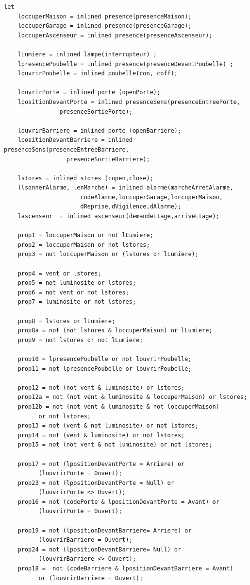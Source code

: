 \documentclass{svjour3}
\begin{document}
\begin{lstlisting}
let
	loccuperMaison = inlined presence(presenceMaison);
	loccuperGarage = inlined presence(presenceGarage);
	loccuperAscenseur = inlined presence(presenceAscenseur);

	lLumiere = inlined lampe(interrupteur) ;
	lpresencePoubelle = inlined presence(presenceDevantPoubelle) ;
	louvrirPoubelle = inlined poubelle(con, coff);

	louvrirPorte = inlined porte (openPorte);
	lpositionDevantPorte = inlined presenceSens(presenceEntreePorte,
				presenceSortiePorte);

	louvrirBarriere = inlined porte (openBarriere);
	lpositionDevantBarriere = inlined presenceSens(presenceEntreeBarriere,
				  presenceSortieBarriere);

	lstores = inlined stores (copen,close);
	(lsonnerAlarme, lenMarche) = inlined alarme(marcheArretAlarme,
				      codeAlarme,loccuperGarage,loccuperMaison,
				      dReprise,dVigilence,dAlarme);
	lascenseur  = inlined ascenseur(demandeEtage,arriveEtage);
	
	prop1 = loccuperMaison or not lLumiere;
	prop2 = loccuperMaison or not lstores;
	prop3 = not loccuperMaison or (lstores or lLumiere);
	
	prop4 = vent or lstores;
	prop5 = not luminosite or lstores;
	prop6 = not vent or not lstores;	
	prop7 = luminosite or not lstores;
	
	prop8 = lstores or lLumiere;
	prop8a = not (not lstores & loccuperMaison) or lLumiere;
	prop9 = not lstores or not lLumiere;

	prop10 = lpresencePoubelle or not louvrirPoubelle;
	prop11 = not lpresencePoubelle or louvrirPoubelle;
	
	prop12 = not (not vent & luminosite) or lstores;
	prop12a = not (not vent & luminosite & loccuperMaison) or lstores;
	prop12b = not (not vent & luminosite & not loccuperMaison) 
		  or not lstores;
	prop13 = not (vent & not luminosite) or not lstores;
	prop14 = not (vent & luminosite) or not lstores;	
	prop15 = not (not vent & not luminosite) or not lstores;

	prop17 = not (lpositionDevantPorte = Arriere) or 
		  (louvrirPorte = Ouvert);
	prop23 = not (lpositionDevantPorte = Null) or 
		  (louvrirPorte <> Ouvert);
	prop16 = not (codePorte & lpositionDevantPorte = Avant) or 
		  (louvrirPorte = Ouvert);	

	prop19 = not (lpositionDevantBarriere= Arriere) or
		  (louvrirBarriere = Ouvert);
	prop24 = not (lpositionDevantBarriere= Null) or 
		  (louvrirBarriere <> Ouvert);
	prop18 =  not (codeBarriere & lpositionDevantBarriere = Avant) 
		  or (louvrirBarriere = Ouvert);
	

\end{lstlisting}
\end{document}
